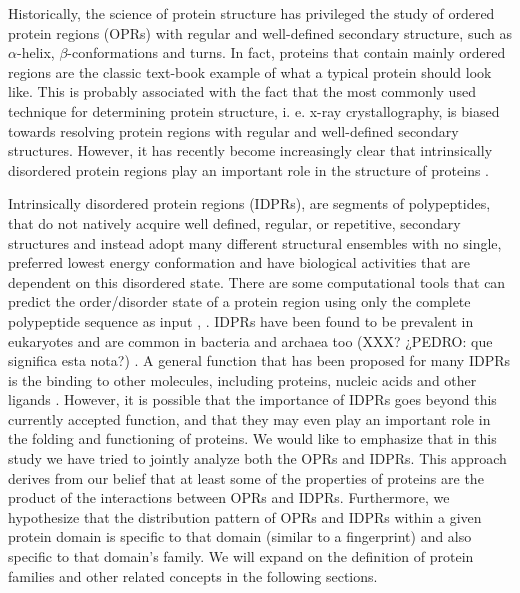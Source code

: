 \documentclass[preprint,12pt]{elsarticle}
\begin{document}
Historically, the science of protein structure has privileged the study of ordered protein regions (OPRs)  with regular and well-defined secondary structure, such as  $\alpha$-helix, $\beta$-conformations and turns. In fact, proteins that contain mainly ordered regions are the classic text-book example of what a typical protein should look like. This is probably associated with the fact that the most commonly used technique for determining protein structure, i. e. x-ray crystallography, is biased towards resolving protein regions with regular and well-defined secondary structures. However,  it has recently become increasingly clear that intrinsically disordered protein regions play an important role in the structure of proteins \cite{oldfield2014intrinsically}.

Intrinsically disordered protein regions (IDPRs), are segments of polypeptides, that do not natively acquire well defined, regular, or repetitive, secondary structures and instead adopt many different structural ensembles with no single, preferred lowest energy conformation and have biological activities that are dependent on this disordered state. There are some computational tools that can predict the order/disorder state of a protein region using only the complete polypeptide sequence as input \cite{vucetic2004disprot},  \cite{piovesan2016disprot}. IDPRs have been found to be prevalent in eukaryotes and are common in bacteria and archaea too (XXX?  ¿PEDRO: que significa esta nota?)  \cite{dunker2000intrinsic} \cite{dunker2002intrinsic} \cite{dunker2013s} \cite{oldfield2014intrinsically}. A general function that has been proposed for many IDPRs is the binding to other molecules, including proteins, nucleic acids and other ligands \cite{dunker2001intrinsically} \cite{van2014classification} \cite{oldfield2014intrinsically}. However, it is possible that the importance of IDPRs goes beyond this currently accepted function, and that they may even play an important role in the folding and functioning of proteins. We would like to emphasize that in this study we have tried to jointly analyze both the OPRs and IDPRs. This approach derives from our belief that at least some of the properties of proteins are the product of the interactions between OPRs and IDPRs. Furthermore, we hypothesize that the distribution pattern of OPRs and IDPRs within a given protein domain is specific to that domain  (similar to a fingerprint) and also specific to that domain’s family. We will expand on the definition of protein families and other related concepts in the following sections. 
\end{document}
